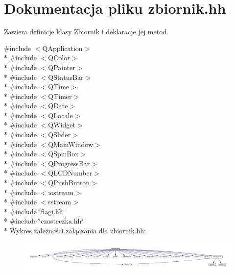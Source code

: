 \hypertarget{zbiornik_8hh}{\section{Dokumentacja pliku zbiornik.\-hh}
\label{zbiornik_8hh}
}


Zawiera definicje klasy \hyperlink{class_zbiornik}{Zbiornik} i deklaracje jej metod.  


{\ttfamily \#include $<$Q\-Application$>$}\\*
{\ttfamily \#include $<$Q\-Color$>$}\\*
{\ttfamily \#include $<$Q\-Painter$>$}\\*
{\ttfamily \#include $<$Q\-Status\-Bar$>$}\\*
{\ttfamily \#include $<$Q\-Time$>$}\\*
{\ttfamily \#include $<$Q\-Timer$>$}\\*
{\ttfamily \#include $<$Q\-Date$>$}\\*
{\ttfamily \#include $<$Q\-Locale$>$}\\*
{\ttfamily \#include $<$Q\-Widget$>$}\\*
{\ttfamily \#include $<$Q\-Slider$>$}\\*
{\ttfamily \#include $<$Q\-Main\-Window$>$}\\*
{\ttfamily \#include $<$Q\-Spin\-Box$>$}\\*
{\ttfamily \#include $<$Q\-Progress\-Bar$>$}\\*
{\ttfamily \#include $<$Q\-L\-C\-D\-Number$>$}\\*
{\ttfamily \#include $<$Q\-Push\-Button$>$}\\*
{\ttfamily \#include $<$iostream$>$}\\*
{\ttfamily \#include $<$sstream$>$}\\*
{\ttfamily \#include \char`\"{}flagi.\-hh\char`\"{}}\\*
{\ttfamily \#include \char`\"{}czasteczka.\-hh\char`\"{}}\\*
Wykres zależności załączania dla zbiornik.\-hh\-:\nopagebreak
\begin{figure}[H]
\begin{center}
\leavevmode
\includegraphics[width=350pt]{zbiornik_8hh__incl}
\end{center}
\end{figure}
